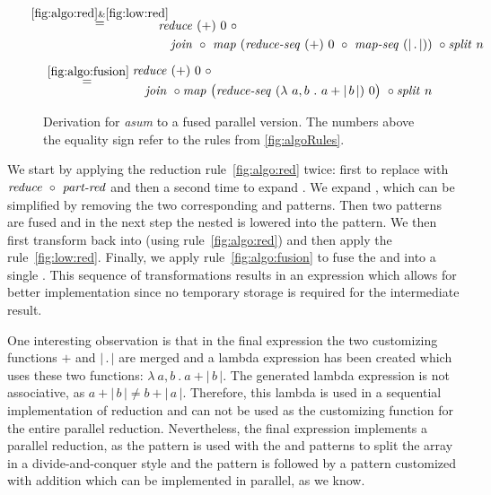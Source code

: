 \begin{figure*}[t]
\begin{align*}
\begin{aligned}
  & \overset{\hspace{-1.3em}\ref{fig:algo:red}\& \ref{fig:low:red}\hspace{-1.1em}}{=\hspace{.2em}}
      \begin{aligned}
        &\\[.5em]
        & \reduce\ (+)\ 0\ \circ\\
        &\quad \join\ \circ\ \map\ (\reduceSeq\ (+)\ 0\ \circ\ \mapSeq\ (|\, .\, |))\ \circ \splitN\ n
      \end{aligned}\\[.5em]
  & \overset{\ref{fig:algo:fusion}}{=\hspace{.2em}}
      \begin{aligned}
        & \reduce\ (+)\ 0\ \circ\\
        &\quad  \join\ \circ \map\ \big(\reduceSeq\ (\lambda\ a, b\ .\ a+|\, b\, |)\ 0\big)\ \circ \splitN\ n
      \end{aligned}
  \end{aligned}
\end{align*}
\caption{Derivation for \emph{asum} to a fused parallel version.
  The numbers above the equality sign refer to the rules from \autoref{fig:algoRules}.
}
\label{fig:derivation}
\end{figure*}


We start by applying the reduction rule~\ref{fig:algo:red} twice:
first to replace \reduce with $\text{\textit{reduce}}\ \circ\ \text{\textit{part-red}}$ and then a second time to expand \partRed.
We expand \map, which can be simplified by removing the two corresponding \join and \splitN patterns.
Then two \map patterns are fused and in the next step the nested \map is lowered into the \mapSeq pattern.
We then first transform \partRed back into \reduce (using rule~\ref{fig:algo:red}) and then apply the \OpenCL rule~\ref{fig:low:red}.
Finally, we apply rule~\ref{fig:algo:fusion} to fuse the \mapSeq and \reduceSeq into a single \reduceSeq.
This sequence of transformations results in an expression which allows for better \OpenCL implementation since no temporary storage is required for the intermediate result.


One interesting observation is that in the final expression the two customizing functions $+$ and $|\, .\,|$ are merged and a lambda expression has been created which uses these two functions: $\lambda\ a, b\ .\ a+|\, b\, |$.
The generated lambda expression is not associative, as $a+|\, b\, | \neq b+|\, a\, |$.
Therefore, this lambda is used in a sequential implementation of reduction and can not be used as the customizing function for the entire parallel reduction.
Nevertheless, the final expression implements a parallel reduction, as the \map pattern is used with the \splitN and \join patterns to split the array in a divide-and-conquer style and the \map pattern is followed by a \reduce pattern customized with addition which can be implemented in parallel, as we know.


